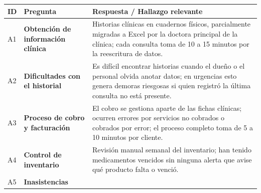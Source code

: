 \documentclass[
]{article}
\newcounter{none} %
\begin{document}
{\def\LTcaptype{none} %
\begin{longtable}[]{|
  >{\centering\arraybackslash}p{}|
  >{\raggedright\arraybackslash}p{}|
  >{\raggedright\arraybackslash}p{}|}
\hline
\begin{minipage}[b]{\linewidth}\centering
\textbf{ID}
\end{minipage} & \begin{minipage}[b]{\linewidth}\centering
\textbf{Pregunta}
\end{minipage} & \begin{minipage}[b]{\linewidth}\raggedright
\textbf{Respuesta / Hallazgo relevante}
\end{minipage} \\
\hline
\endhead
\hline
\endlastfoot
A1 & \textbf{Obtención de información clínica} &
\begin{minipage}[t]{\linewidth}\raggedright
Historias clínicas en cuadernos físicos, parcialmente migradas a Excel por la doctora principal de la clínica; cada consulta toma de 10 a 15 minutos por la reescritura de datos.
\end{minipage} \\
\hline
A2 & \textbf{Dificultades con el historial} &
\begin{minipage}[t]{\linewidth}\raggedright
Es difícil encontrar historias cuando el dueño o el personal olvida anotar datos; en urgencias esto genera demoras riesgosas si quien registró la última consulta no está presente.
\end{minipage} \\
\hline
A3 & \textbf{Proceso de cobro y facturación} &
\begin{minipage}[t]{\linewidth}\raggedright
El cobro se gestiona aparte de las fichas clínicas; ocurren errores por servicios no cobrados o cobrados por error; el proceso completo toma de 5 a 10 minutos por cliente.
\end{minipage} \\
\hline
A4 & \textbf{Control de inventario} &
\begin{minipage}[t]{\linewidth}\raggedright
Revisión manual semanal del inventario; han tenido medicamentos vencidos sin ninguna alerta que avise qué producto falta o venció.
\end{minipage} \\
\hline
A5 & \textbf{Inasistencias} &
\begin{minipage}[t]{\linewidth}\raggedright

\end{minipage}
\end{longtable}}
\end{document}
